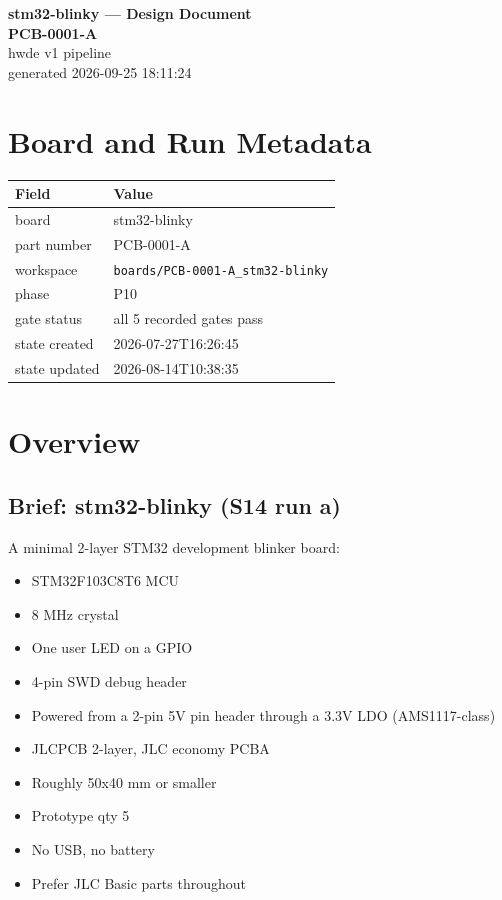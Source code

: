 \documentclass[11pt,a4paper]{article}
\begin{document}
\sloppy
\begin{center}
{\LARGE\bfseries stm32-blinky --- Design Document}\\[6pt]
{\Large\bfseries PCB-0001-A}\\[6pt]
{\large hwde v1 pipeline}\\[2pt]
generated 2026-09-25 18:11:24
\end{center}
\tableofcontents

\section{Board and Run Metadata}
{\small
\begin{longtable}{lp{11cm}}
\toprule
\textbf{Field} & \textbf{Value} \\
\midrule
\endhead
board & stm32-blinky \\
part number & PCB-0001-A \\
workspace & \texttt{boards/PCB-0001-A\_stm32-blinky} \\
phase & P10 \\
gate status & all 5 recorded gates pass \\
state created & 2026-07-27T16:26:45 \\
state updated & 2026-08-14T10:38:35 \\
\bottomrule
\end{longtable}
}
\section{Overview}
\subsection*{Brief: stm32-blinky (S14 run a)}
A minimal 2-layer STM32 development blinker board:

\begin{itemize}
\item STM32F103C8T6 MCU
\item 8 MHz crystal
\item One user LED on a GPIO
\item 4-pin SWD debug header
\item Powered from a 2-pin 5V pin header through a 3.3V LDO (AMS1117-class)
\item JLCPCB 2-layer, JLC economy PCBA
\item Roughly 50x40 mm or smaller
\item Prototype qty 5
\item No USB, no battery
\item Prefer JLC Basic parts throughout
\end{itemize}
\end{document}

